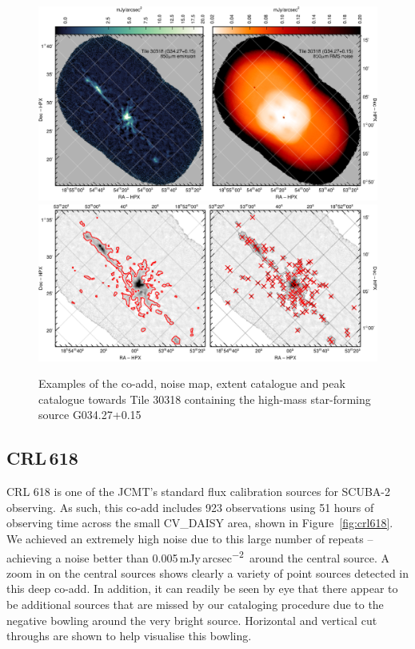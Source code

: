 \documentclass[twocolumn,times]{aastex6}
\newcommand{\jyas}{Jy\,arcsec\textsuperscript{$-$2}}
\begin{document}
\begin{figure}
  \centering
  \includegraphics{tile30318-g34-coadd-noise.pdf}
  \\[3mm]
  \includegraphics{tile30318-g34-extent-peak.pdf}
  \caption{Examples of the co-add, noise map, extent catalogue and peak
    catalogue towards Tile 30318 containing the high-mass star-forming
    source G034.27+0.15}
  \label{fig:g34-3}
\end{figure}
\subsection{CRL\,618}
CRL 618 is one of the JCMT's standard flux calibration sources for
SCUBA-2 observing. As such, this co-add includes 923 observations using
51 hours of observing time across the small CV\_DAISY area, shown in
Figure~\ref{fig:crl618}. We achieved an extremely high noise due to
this large number of repeats -- achieving a noise better than
0.005\,m\jyas\ around the central source. A zoom in on the central
sources shows clearly a variety of point sources detected in this deep
co-add. In addition, it can readily be seen by eye that there appear to
be additional sources that are missed by our cataloging procedure due
to the negative bowling around the very bright source. Horizontal and
vertical cut throughs are shown to help visualise this bowling.
\end{document}
